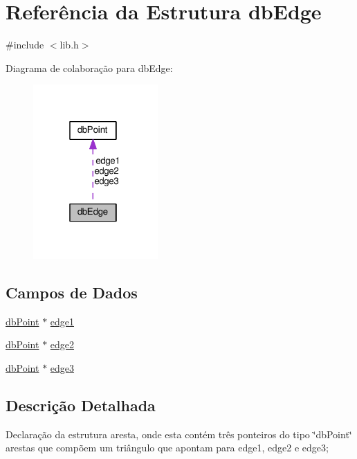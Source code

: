 \hypertarget{structdbEdge}{}\section{Referência da Estrutura db\+Edge}
\label{structdbEdge}


{\ttfamily \#include $<$lib.\+h$>$}



Diagrama de colaboração para db\+Edge\+:\nopagebreak
\begin{figure}[H]
\begin{center}
\leavevmode
\includegraphics[width=135pt]{structdbEdge__coll__graph}
\end{center}
\end{figure}
\subsection*{Campos de Dados}
\begin{DoxyCompactItemize}
\item 
\hyperlink{structdbPoint}{db\+Point} $\ast$ \hyperlink{structdbEdge_a0886057d00d21df9488a339b5dd15f4a}{edge1}
\item 
\hyperlink{structdbPoint}{db\+Point} $\ast$ \hyperlink{structdbEdge_a2b83dba0cd9a8636cdb2eee74a1c6573}{edge2}
\item 
\hyperlink{structdbPoint}{db\+Point} $\ast$ \hyperlink{structdbEdge_a36b1358ac94b0054e16334e6727b6d2a}{edge3}
\end{DoxyCompactItemize}


\subsection{Descrição Detalhada}
Declaração da estrutura aresta, onde esta contém três ponteiros do tipo \char`\"{}db\+Point\char`\"{} arestas que compõem um triângulo que apontam para edge1, edge2 e edge3; 


